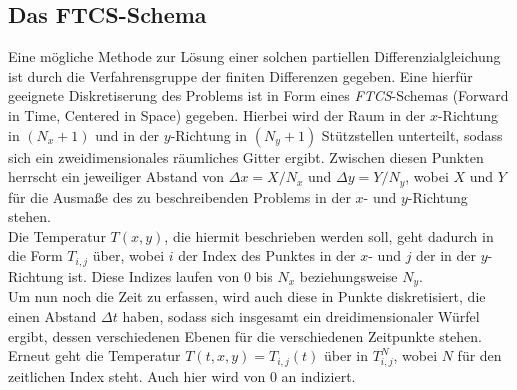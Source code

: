 \documentclass[12pt,a4paper,titlepage,headinclude,bibtotoc]{scrartcl}
\begin{document}
\subsection{Das FTCS-Schema}
\label{sec:ftcs}
Eine mögliche Methode zur Lösung einer solchen partiellen Differenzialgleichung ist durch die Verfahrensgruppe der finiten Differenzen gegeben. Eine hierfür geeignete Diskretiserung des Problems ist in Form eines \textit{FTCS}-Schemas (Forward in Time, Centered in Space) gegeben. Hierbei wird der Raum in der $x$-Richtung in $(N_x+1)$ und in der $y$-Richtung in $(N_y+1)$ Stützstellen unterteilt, sodass sich ein zweidimensionales räumliches Gitter ergibt. Zwischen diesen Punkten herrscht ein jeweiliger Abstand von $\Delta x = X/N_x$ und $\Delta y = Y/N_y$, wobei $X$ und $Y$ für die Ausmaße des zu beschreibenden Problems in der $x$- und $y$-Richtung stehen.\\
Die Temperatur $T(x, y)$, die hiermit beschrieben werden soll, geht dadurch in die Form $T_{i,j}$ über, wobei $i$ der Index des Punktes in der $x$- und $j$ der in der $y$-Richtung ist. Diese Indizes laufen von $0$ bis $N_x$ beziehungsweise $N_y$.\\
Um nun noch die Zeit zu erfassen, wird auch diese in Punkte diskretisiert, die einen Abstand $\Delta t$ haben, sodass sich insgesamt ein dreidimensionaler Würfel ergibt, dessen verschiedenen Ebenen für die verschiedenen Zeitpunkte stehen. Erneut geht die Temperatur $T(t, x, y) = T_{i,j}(t)$ über in $T_{i,j}^N$, wobei $N$ für den zeitlichen Index steht. Auch hier wird von $0$ an indiziert.\\
\end{document}
